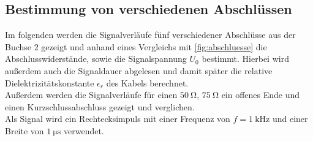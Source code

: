 




\subsection{Bestimmung von verschiedenen Abschlüssen}

Im folgenden werden die Signalverläufe fünf verschiedener Abschlüsse aus der Buchse 2 gezeigt und anhand eines Vergleichs mit \autoref{fig:abschluesse} die Abschlusswiderstände, sowie die Signalspannung $U_0$ bestimmt. Hierbei wird außerdem auch die Signaldauer abgelesen und damit später die relative Dielektrizitätskonstante $\epsilon_r$ des Kabels berechnet.\\
Außerdem werden die Signalverläufe für einen $\qty{50}{\ohm}$, $\qty{75}{\ohm}$ ein offenes Ende und einen Kurzschlussabschluss gezeigt und verglichen. \\
Als Signal wird ein Rechtecksimpuls mit einer Frequenz von $f=\qty{1}{\kilo\hertz}$ und einer Breite von $\qty{1}{\micro\second}$ verwendet.

